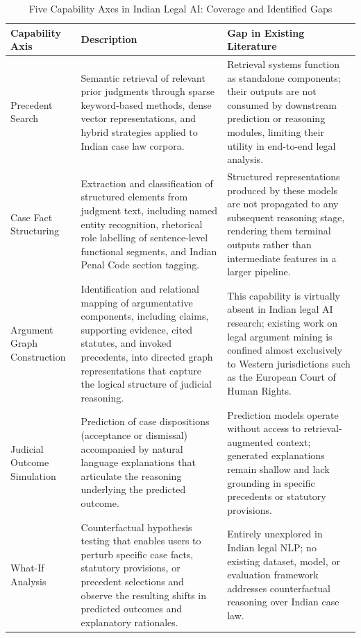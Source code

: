 \begin{table}[t]
\centering
\caption{Five Capability Axes in Indian Legal AI: Coverage and Identified Gaps}
\label{tab:axes}
\begin{tabular}{>{\raggedright\arraybackslash}p{3.2cm} >{\raggedright\arraybackslash}p{6.8cm} >{\raggedright\arraybackslash}p{6.8cm}}
\toprule
\textbf{Capability Axis} & \textbf{Description} & \textbf{Gap in Existing Literature} \\
\midrule
Precedent Search &
Semantic retrieval of relevant prior judgments through sparse keyword-based methods, dense vector representations, and hybrid strategies applied to Indian case law corpora. &
Retrieval systems function as standalone components; their outputs are not consumed by downstream prediction or reasoning modules, limiting their utility in end-to-end legal analysis. \\
\addlinespace
Case Fact Structuring &
Extraction and classification of structured elements from judgment text, including named entity recognition, rhetorical role labelling of sentence-level functional segments, and Indian Penal Code section tagging. &
Structured representations produced by these models are not propagated to any subsequent reasoning stage, rendering them terminal outputs rather than intermediate features in a larger pipeline. \\
\addlinespace
Argument Graph Construction &
Identification and relational mapping of argumentative components, including claims, supporting evidence, cited statutes, and invoked precedents, into directed graph representations that capture the logical structure of judicial reasoning. &
This capability is virtually absent in Indian legal AI research; existing work on legal argument mining is confined almost exclusively to Western jurisdictions such as the European Court of Human Rights. \\
\addlinespace
Judicial Outcome Simulation &
Prediction of case dispositions (acceptance or dismissal) accompanied by natural language explanations that articulate the reasoning underlying the predicted outcome. &
Prediction models operate without access to retrieval-augmented context; generated explanations remain shallow and lack grounding in specific precedents or statutory provisions. \\
\addlinespace
What-If Analysis &
Counterfactual hypothesis testing that enables users to perturb specific case facts, statutory provisions, or precedent selections and observe the resulting shifts in predicted outcomes and explanatory rationales. &
Entirely unexplored in Indian legal NLP; no existing dataset, model, or evaluation framework addresses counterfactual reasoning over Indian case law. \\
\bottomrule
\end{tabular}
\end{table}

